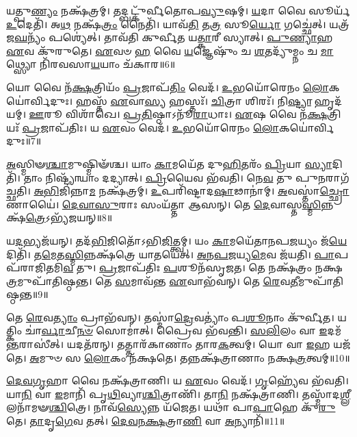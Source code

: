 𑌯𑌤𑍍𑌪𑍁\-\ul{𑌣𑍍𑌯𑌂} 𑌨𑌕𑍍𑌷᳴𑌤𑍍𑌰𑌮𑍍।
𑌤𑌦𑍍𑌬𑌟𑍍𑌕𑍁᳴𑌰𑍍𑌵𑍀𑌤𑍋𑌪\-\ul{𑌵𑍍𑌯𑍁}\-𑌷𑌮𑍍।
\-\ul{𑌯}\-𑌦𑌾 𑌵𑍈 𑌸𑍂𑌰𑍍𑌯᳴ \ul{𑌉}\-𑌦𑍇𑌤𑌿᳴।
𑌅\-\ul{𑌥} 𑌨𑌕𑍍𑌷᳴\-\ul{𑌤𑍍𑌰𑌂} 𑌨𑍈𑌤𑌿᳴।
𑌯𑌾𑌵᳴\-\ul{𑌤𑌿} 𑌤\-\ul{𑌤𑍍𑌰} 𑌸𑍂\-\ul{𑌰𑍍𑌯𑍋} 𑌗𑌚𑍍𑌛𑍇॑𑌤𑍍।
𑌯𑌤𑍍𑌰᳴ 𑌜\-\ul{𑌘}\-𑌨𑍍𑌯𑌂᳴ 𑌪𑌶𑍍𑌯𑍇॑𑌤𑍍।
𑌤𑌾𑌵᳴𑌤𑌿 𑌕𑍁𑌰𑍍𑌵𑍀𑌤 𑌯\-\ul{𑌤𑍍𑌕𑌾}\-𑌰𑍀 𑌸𑍍𑌯𑌾𑌤𑍍।
\-\ul{𑌪𑍁}\-\-\ul{𑌣𑍍𑌯𑌾}\-𑌹 \ul{𑌏}\-𑌵 𑌕𑍁᳴𑌰𑍁𑌤𑍇।
\-\ul{𑌏}\-𑌵𑍞 \ul{𑌹} 𑌵𑍈 \ul{𑌯}\-𑌜𑍍𑌞𑍇𑌷𑍁𑌂᳴ 𑌚 \ul{𑌶}\-𑌤𑌦𑍍𑌯𑍁᳴𑌮𑍍𑌨𑌂 𑌚 \ul{𑌮𑌾}\-𑌥𑍍𑌸𑍍𑌯𑍋 𑌨𑌿᳴𑌰𑌵𑌸𑌾\-\ul{𑌯}\-𑌯𑌾𑌂 𑌚᳴𑌕𑌾𑌰॥6॥

𑌯𑍋 𑌵𑍈 𑌨᳴\-\ul{𑌕𑍍𑌷}\-𑌤𑍍𑌰𑌿𑌯𑌂᳴ \ul{𑌪𑍍𑌰}\-𑌜𑌾𑌪᳴\-\ul{𑌤𑌿𑌂} 𑌵𑍇𑌦᳴।
\-\ul{𑌉}\-𑌭𑌯𑍋᳴𑌰𑍇𑌨𑌂 \ul{𑌲𑍋}\-𑌕𑌯𑍋॑𑌰𑍍𑌵𑌿𑌦𑍁𑌃।
𑌹𑌸𑍍𑌤᳴ \ul{𑌏}\-𑌵𑌾\-\ul{𑌸𑍍𑌯} 𑌹𑌸𑍍𑌤𑌃᳴।
\-\ul{𑌚𑌿}\-𑌤𑍍𑌰𑌾 𑌶𑌿𑌰𑌃᳴।
𑌨𑌿\-\ul{𑌷𑍍𑌟𑍍𑌯𑌾} 𑌹𑍃𑌦᳴𑌯𑌮𑍍।
\-\ul{𑌊}\-𑌰𑍂 𑌵𑌿𑌶𑌾᳴𑌖𑍇।
\-\ul{𑌪𑍍𑌰}\-\-\ul{𑌤𑌿}\-𑌷𑍍𑌠𑌾\-𑌽𑌨𑍂᳴\-\ul{𑌰𑌾}\-𑌧𑌾𑌃।
\-\ul{𑌏}\-𑌷 𑌵𑍈 𑌨᳴\-\ul{𑌕𑍍𑌷}\-𑌤𑍍𑌰𑌿𑌯𑌃᳴ \ul{𑌪𑍍𑌰}\-𑌜𑌾\-𑌪᳴𑌤𑌿𑌃।
𑌯 \ul{𑌏}\-𑌵𑌂 𑌵𑍇𑌦᳴।
\-\ul{𑌉}\-𑌭𑌯𑍋᳴𑌰𑍇𑌨𑌂 \ul{𑌲𑍋}\-𑌕𑌯𑍋॑𑌰𑍍𑌵𑌿𑌦𑍁𑌃॥7॥

\-\ul{𑌅}\-𑌸𑍍𑌮𑌿𑍟\-\ul{𑌶𑍍𑌚𑌾}\-𑌮𑍁𑌷𑍍𑌮𑌿𑍟᳴𑌶𑍍𑌚।
𑌯𑌾𑌂 \ul{𑌕𑌾}\-𑌮𑌯𑍇᳴𑌤 𑌦𑍁\-\ul{𑌹𑌿}\-𑌤𑌰𑌂᳴ \ul{𑌪𑍍𑌰𑌿}\-𑌯𑌾 \ul{𑌸𑍍𑌯𑌾}\-𑌦𑌿𑌤𑌿᳴।
𑌤𑌾𑌂 𑌨𑌿𑌷𑍍𑌟𑍍𑌯𑌾᳴𑌯𑌾𑌂 𑌦𑌦𑍍𑌯𑌾𑌤𑍍।
\-\ul{𑌪𑍍𑌰𑌿}\-𑌯𑍈𑌵 𑌭᳴𑌵𑌤𑌿।
𑌨𑍇\-\ul{𑌵} 𑌤𑍁 𑌪𑍁\-\ul{𑌨}\-𑌰𑌾𑌗᳴𑌚𑍍𑌛𑌤𑌿।
\-\ul{𑌅}\-\-\ul{𑌭𑌿}\-𑌜𑌿𑌨𑍍𑌨𑌾\-\ul{𑌮} 𑌨𑌕𑍍𑌷᳴𑌤𑍍𑌰𑌮𑍍।
\-\ul{𑌉}\-𑌪𑌰𑌿᳴𑌷𑍍𑌟𑌾𑌦\-\ul{𑌷𑌾}\-𑌢𑌾𑌨𑌾॑𑌮𑍍।
\-\ul{𑌅}\-𑌵𑌸𑍍𑌤𑌾॑\-\ul{𑌚𑍍𑌛𑍍𑌰𑍋}\-𑌣𑌾𑌯𑍈॑।
\-\ul{𑌦𑍇}\-\-\ul{𑌵𑌾}\-\-\ul{𑌸𑍁}\-𑌰𑌾𑌃 𑌸𑌂𑌯᳴𑌤𑍍𑌤𑌾 𑌆𑌸𑌨𑍍।
𑌤𑍇 \ul{𑌦𑍇}\-𑌵𑌾𑌸𑍍𑌤\-\ul{𑌸𑍍𑌮𑌿}\-𑌨𑍍𑌨𑌕𑍍𑌷᳴\-\ul{𑌤𑍍𑌰𑍇}\-\-𑌽𑌭𑍍𑌯᳴𑌜𑌯𑌨𑍍॥8॥

𑌯\-\ul{𑌦}\-𑌭𑍍𑌯𑌜᳴𑌯𑌨𑍍।
𑌤𑌦᳴\-\ul{𑌭𑌿}\-𑌜𑌿𑌤𑍋᳴\-𑌽𑌭𑌿\-\ul{𑌜𑌿}\-𑌤𑍍𑌤𑍍𑌵𑌮𑍍।
𑌯𑌂 \ul{𑌕𑌾}\-𑌮𑌯𑍇᳴𑌤𑌾𑌨𑌪\-\-\ul{𑌜}\-𑌯𑍍𑌯𑌂 𑌜᳴\-\ul{𑌯𑍇}\-𑌦𑌿𑌤𑌿᳴।
𑌤\-\ul{𑌮𑍇}\-𑌤\-\ul{𑌸𑍍𑌮𑌿}\-𑌨𑍍𑌨𑌕𑍍𑌷᳴𑌤𑍍𑌰𑍇 𑌯𑌾𑌤𑌯𑍇𑌤𑍍।
\-\ul{𑌅}\-\-\ul{𑌨}\-\-\ul{𑌪}\-\-\ul{𑌜}\-𑌯𑍍𑌯\-\ul{𑌮𑍇}\-𑌵 𑌜᳴𑌯𑌤𑌿।
\-\ul{𑌪𑌾}\-𑌪𑌪᳴𑌰𑌾𑌜𑌿𑌤𑌮𑌿\-\ul{𑌵} 𑌤𑍁।
\-\ul{𑌪𑍍𑌰}\-𑌜𑌾\-𑌪᳴𑌤𑌿𑌃 \ul{𑌪}\-𑌶𑍂𑌨᳴\-𑌸𑍃𑌜𑌤।
𑌤𑍇 𑌨𑌕𑍍𑌷᳴𑌤𑍍𑌰𑌂 𑌨𑌕𑍍𑌷\-\ul{𑌤𑍍𑌰}\-𑌮𑍁𑌪𑌾᳴𑌤𑌿𑌷𑍍𑌠𑌨𑍍𑌤।
𑌤𑍇 \ul{𑌸}\-𑌮𑌾𑌵᳴𑌨𑍍𑌤 \ul{𑌏}\-𑌵𑌾𑌭᳴𑌵𑌨𑍍।
𑌤𑍇 \ul{𑌰𑍇}\-𑌵\-\ul{𑌤𑍀}\-𑌮𑍁𑌪𑌾᳴𑌤𑌿𑌷𑍍𑌠𑌨𑍍𑌤॥9॥

𑌤𑍇 \ul{𑌰𑍇}\-𑌵\-\ul{𑌤𑍍𑌯𑌾𑌂} 𑌪𑍍𑌰𑌾𑌭᳴𑌵𑌨𑍍।
𑌤𑌸𑍍𑌮𑌾॑\-\ul{𑌦𑍍𑌰𑍇}\-𑌵𑌤𑍍𑌯𑌾𑌂॑ 𑌪\-\ul{𑌶𑍂}\-𑌨𑌾𑌂 𑌕𑍁᳴𑌰𑍍𑌵𑍀𑌤।
𑌯𑌤𑍍𑌕𑌿𑌂 𑌚𑌾॑\-\ul{𑌰𑍍𑌵𑌾}\-𑌚𑍀\-\ul{𑌨}\-\-\ul{𑍞} 𑌸𑍋𑌮𑌾॑𑌤𑍍।
𑌪𑍍𑌰𑍈𑌵 𑌭᳴𑌵𑌨𑍍𑌤𑌿।
\-\ul{𑌸}\-\-\ul{𑌲𑌿}\-𑌲𑌂 𑌵𑌾 \ul{𑌇}\-𑌦𑌮᳴\-\ul{𑌨𑍍𑌤}\-𑌰𑌾𑌸𑍀॑𑌤𑍍।
𑌯𑌦𑌤᳴𑌰𑌨𑍍।
𑌤𑌤𑍍𑌤𑌾𑌰᳴𑌕𑌾𑌣𑌾𑌂 𑌤𑌾𑌰\-\ul{𑌕}\-𑌤𑍍𑌵𑌮𑍍।
𑌯𑍋 𑌵𑌾 \ul{𑌇}\-𑌹 𑌯𑌜᳴𑌤𑍇।
\-\ul{𑌅}\-𑌮𑍁𑍞 𑌸 \ul{𑌲𑍋}\-𑌕𑌂 𑌨᳴𑌕𑍍𑌷𑌤𑍇।
𑌤𑌨𑍍𑌨𑌕𑍍𑌷᳴𑌤𑍍𑌰𑌾𑌣𑌾𑌂 𑌨𑌕𑍍𑌷\-\ul{𑌤𑍍𑌰}\-𑌤𑍍𑌵𑌮𑍍॥10॥

\-\ul{𑌦𑍇}\-\-\ul{𑌵}\-\-\ul{𑌗𑍃}\-𑌹𑌾 𑌵𑍈 𑌨𑌕𑍍𑌷᳴𑌤𑍍𑌰𑌾𑌣𑌿।
𑌯 \ul{𑌏}\-𑌵𑌂 𑌵𑍇𑌦᳴।
\-\ul{𑌗𑍃}\-𑌹𑍍𑌯𑍇᳴𑌵 𑌭᳴𑌵𑌤𑌿।
𑌯𑌾\-\ul{𑌨𑌿} 𑌵𑌾 \ul{𑌇}\-𑌮𑌾𑌨𑌿᳴ 𑌪𑍃\-\ul{𑌥𑌿}\-𑌵𑍍𑌯𑌾\-\ul{𑌶𑍍𑌚𑌿}\-𑌤𑍍𑌰𑌾𑌣𑌿᳴।
𑌤𑌾\-\ul{𑌨𑌿} 𑌨𑌕𑍍𑌷᳴𑌤𑍍𑌰𑌾𑌣𑌿।
𑌤𑌸𑍍𑌮𑌾᳴𑌦\-\ul{𑌶𑍍𑌲𑍀}\-𑌲𑌨𑌾᳴𑌮𑍟\-\ul{𑌶𑍍𑌚𑌿}\-𑌤𑍍𑌰𑍇।
𑌨𑌾𑌵᳴\-\ul{𑌸𑍍𑌯𑍇}\-𑌨𑍍𑌨 𑌯᳴𑌜𑍇𑌤।
𑌯𑌥𑌾᳴ 𑌪𑌾\-\ul{𑌪𑌾}\-𑌹𑍇 𑌕𑍁᳴\-\ul{𑌰𑍁}\-𑌤𑍇।
\-\ul{𑌤𑌾}\-𑌦𑍃\-\ul{𑌗𑍇}\-𑌵 𑌤𑌤𑍍।
\-\ul{𑌦𑍇}\-\-\ul{𑌵}\-\-\ul{𑌨}\-\-\ul{𑌕𑍍𑌷}\-𑌤𑍍𑌰𑌾\-\ul{𑌣𑌿} 𑌵𑌾 \ul{𑌅}\-𑌨𑍍𑌯𑌾𑌨𑌿᳴॥11॥

